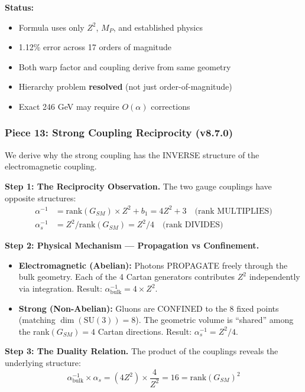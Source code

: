 \documentclass[12pt,a4paper]{article}
\newcommand{\Zsq}{Z^2}
\begin{document}
\textbf{Status:}
\begin{itemize}[itemsep=0pt]
    \item[\checkmark] Formula uses only $\Zsq$, $M_P$, and established physics
    \item[\checkmark] 1.12\% error across 17 orders of magnitude
    \item[\checkmark] Both warp factor and coupling derive from same geometry
    \item[\checkmark] Hierarchy problem \textbf{resolved} (not just order-of-magnitude)
    \item[$\sim$] Exact 246 GeV may require $O(\alpha)$ corrections
\end{itemize}

\subsubsection{Piece 13: Strong Coupling Reciprocity (v8.7.0)}

We derive why the strong coupling has the INVERSE structure of the electromagnetic coupling.

\textbf{Step 1: The Reciprocity Observation.}
The two gauge couplings have opposite structures:
\begin{align}
\alpha^{-1} &= \text{rank}(G_{SM}) \times \Zsq + b_1 = 4\Zsq + 3 \quad \text{(rank MULTIPLIES)} \\
\alpha_s^{-1} &= \Zsq / \text{rank}(G_{SM}) = \Zsq / 4 \quad \text{(rank DIVIDES)}
\end{align}

\textbf{Step 2: Physical Mechanism --- Propagation vs Confinement.}
\begin{itemize}[itemsep=0pt]
    \item \textbf{Electromagnetic (Abelian):} Photons PROPAGATE freely through the bulk geometry. Each of the 4 Cartan generators contributes $\Zsq$ independently via integration. Result: $\alpha^{-1}_{\text{bulk}} = 4 \times \Zsq$.
    \item \textbf{Strong (Non-Abelian):} Gluons are CONFINED to the 8 fixed points (matching $\dim(\text{SU}(3)) = 8$). The geometric volume is ``shared'' among the rank$(G_{SM}) = 4$ Cartan directions. Result: $\alpha_s^{-1} = \Zsq / 4$.
\end{itemize}

\textbf{Step 3: The Duality Relation.}
The product of the couplings reveals the underlying structure:
\begin{equation}
\alpha^{-1}_{\text{bulk}} \times \alpha_s = (4\Zsq) \times \frac{4}{\Zsq} = 16 = \text{rank}(G_{SM})^2
\end{equation}
\end{document}
